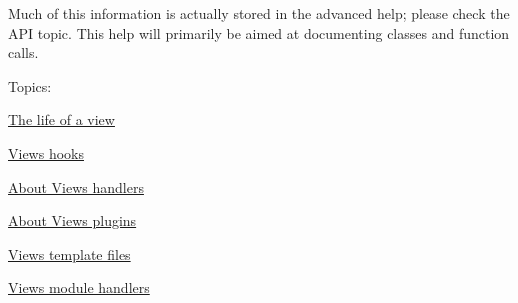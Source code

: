 Much of this information is actually stored in the advanced help; please check the API topic. This help will primarily be aimed at documenting classes and function calls.

Topics:
\begin{DoxyItemize}
\item \hyperlink{group__views__lifetime}{The life of a view }
\item \hyperlink{group__views__hooks}{Views hooks }
\item \hyperlink{group__views__handlers}{About Views handlers }
\item \hyperlink{group__views__plugins}{About Views plugins }
\item \hyperlink{group__views__templates}{Views template files }
\item \hyperlink{group__views__module__handlers}{Views module handlers } 
\end{DoxyItemize}